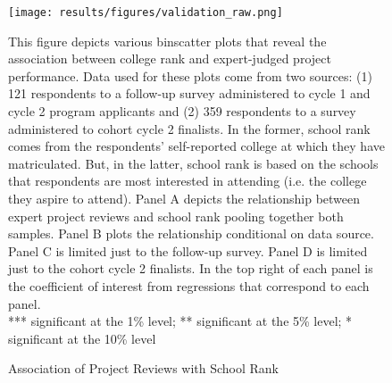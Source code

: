     \newpage
    \begin{figure}[!htb]
    \centering
        \caption{Association of Project Reviews with School Rank} \label{fig:proj_robust_1}
    \texttt{[image: results/figures/validation\_raw.png]} 
        \begin{notes}  
        This figure depicts various binscatter plots that reveal the association between college rank and expert-judged project performance. Data used for these plots come from two sources: (1) 121 respondents to a follow-up survey administered to cycle 1 and cycle 2 program applicants and (2) 359 respondents to a survey administered to cohort cycle 2 finalists. In the former, school rank comes from the respondents' self-reported college at which they have matriculated. But, in the latter, school rank is based on the schools that respondents are most interested in attending (i.e. the college they aspire to attend). Panel A depicts the relationship between expert project reviews and school rank pooling together both samples. Panel B plots the relationship conditional on data source. Panel C is limited just to the follow-up survey. Panel D is limited just to the cohort cycle 2 finalists. In the top right of each panel is the coefficient of interest from regressions that correspond to each panel. \\
        
       *** significant at the 1\% level; ** significant at the 5\% level; * significant at the 10\% level
        \end{notes}
    \end{figure}
    
